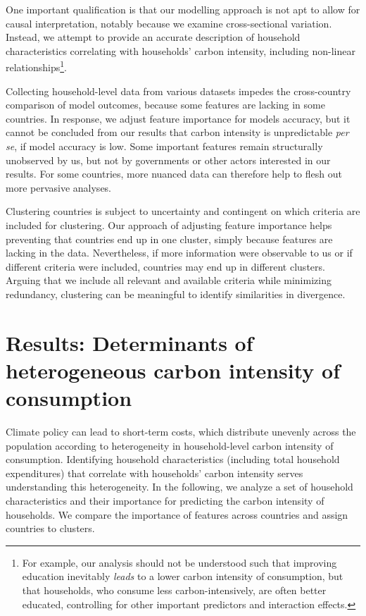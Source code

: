 \documentclass[12pt, a4paper]{article}
\begin{document}
One important qualification is that our modelling approach is not apt to allow for causal interpretation, notably because we examine cross-sectional variation. Instead, we attempt to provide an accurate description of household characteristics correlating with households' carbon intensity, including non-linear relationships\footnote{For example, our analysis should not be understood such that improving education inevitably \textit{leads} to a lower carbon intensity of consumption, but that households, who consume less carbon-intensively, are often better educated, controlling for other important predictors and interaction effects.}.

Collecting household-level data from various datasets impedes the cross-country comparison of model outcomes, because some features are lacking in some countries. In response, we adjust feature importance for models accuracy, but it cannot be concluded from our results that carbon intensity is unpredictable \textit{per se}, if model accuracy is low. Some important features remain structurally unobserved by us, but not by governments or other actors interested in our results. For some countries, more nuanced data can therefore help to flesh out more pervasive analyses.

Clustering countries is subject to uncertainty and contingent on which criteria are included for clustering. Our approach of adjusting feature importance helps preventing that countries end up in one cluster, simply because features are lacking in the data. Nevertheless, if more information were observable to us or if different criteria were included, countries may end up in different clusters. Arguing that we include all relevant and available criteria while minimizing redundancy, clustering can be meaningful to identify similarities in divergence.

\section{Results: Determinants of heterogeneous carbon intensity of consumption} \label{sec:results}

Climate policy can lead to short-term costs, which distribute unevenly across the population according to heterogeneity in household-level carbon intensity of consumption. Identifying household characteristics (including total household expenditures) that correlate with households' carbon intensity serves understanding this heterogeneity. In the following, we analyze a set of household characteristics and their importance for predicting the carbon intensity of households. We compare the importance of features across countries and assign countries to clusters.
\end{document}
